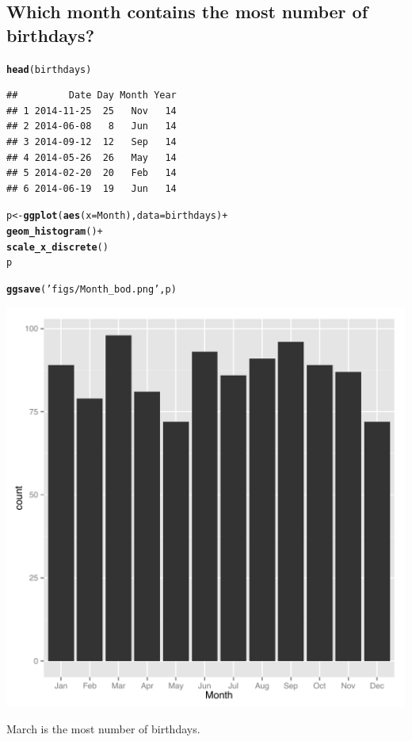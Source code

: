 \documentclass{article}\usepackage[]{graphicx}\usepackage[]{color}
\makeatletter
\newcommand{\hlstr}[1]{\textcolor[rgb]{0.192,0.494,0.8}{#1}}%
\newcommand{\hlopt}[1]{\textcolor[rgb]{0,0,0}{#1}}%
\newcommand{\hlstd}[1]{\textcolor[rgb]{0.345,0.345,0.345}{#1}}%
\newcommand{\hlkwb}[1]{\textcolor[rgb]{0.69,0.353,0.396}{#1}}%
\newcommand{\hlkwc}[1]{\textcolor[rgb]{0.333,0.667,0.333}{#1}}%
\newcommand{\hlkwd}[1]{\textcolor[rgb]{0.737,0.353,0.396}{\textbf{#1}}}%
\newenvironment{kframe}{%
 \def\at@end@of@kframe{}%
 \ifinner\ifhmode%
  \def\at@end@of@kframe{\end{minipage}}%
  \begin{minipage}{\columnwidth}%
 \fi\fi%
 \def\FrameCommand##1{\hskip\@totalleftmargin \hskip-\fboxsep
 \colorbox{shadecolor}{##1}\hskip-\fboxsep
     \hskip-\linewidth \hskip-\@totalleftmargin \hskip\columnwidth}%
 \MakeFramed {\advance\hsize-\width
   \@totalleftmargin\z@ \linewidth\hsize
   \@setminipage}}%
 {\par\unskip\endMakeFramed%
 \at@end@of@kframe}
\newenvironment{knitrout}{}{} %
\makeatother
\begin{document}
\subsection{Which month contains the most number of birthdays?}
\begin{knitrout}
\color{fgcolor}\begin{kframe}
\begin{alltt}
\hlkwd{head}\hlstd{(birthdays)}
\end{alltt}
\begin{verbatim}
##         Date Day Month Year
## 1 2014-11-25  25   Nov   14
## 2 2014-06-08   8   Jun   14
## 3 2014-09-12  12   Sep   14
## 4 2014-05-26  26   May   14
## 5 2014-02-20  20   Feb   14
## 6 2014-06-19  19   Jun   14
\end{verbatim}
\begin{alltt}
\hlstd{p} \hlkwb{<-} \hlkwd{ggplot}\hlstd{(}\hlkwd{aes}\hlstd{(}\hlkwc{x}\hlstd{=Month),} \hlkwc{data}\hlstd{=birthdays)} \hlopt{+}
        \hlkwd{geom_histogram}\hlstd{()} \hlopt{+}
        \hlkwd{scale_x_discrete}\hlstd{()}
\hlstd{p}

\hlkwd{ggsave}\hlstd{(}\hlstr{'figs/Month_bod.png'}\hlstd{, p)}
\end{alltt}


{\ttfamily\noindent\itshape\color{messagecolor}{\#\# Saving 7 x 7 in image}}\end{kframe}

{\centering \includegraphics[width=.4\linewidth]{figs/unnamed-chunk-5-1} 

}



\end{knitrout}

March is the most number of birthdays.
\end{document}
